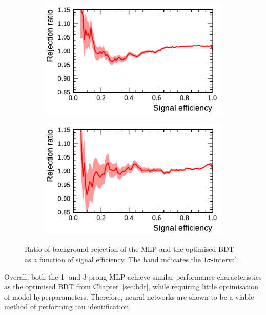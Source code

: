 \begin{figure}[htb]
  \begin{subfigure}[t]{0.48\textwidth}
    \centering
    \includegraphics{./figures/rnn/mlp/mlp_bdt_ratio_1p.pdf}
  \end{subfigure}\hfill
  \begin{subfigure}[t]{0.48\textwidth}
    \centering
    \includegraphics{./figures/rnn/mlp/mlp_bdt_ratio_3p.pdf}
  \end{subfigure}
  \caption[Ratio of the background rejection for MLP and optimised BDT as a
  function of signal efficiency]{Ratio of background rejection of the MLP and
    the optimised BDT as a function of signal efficiency. The band indicates the
    $1\sigma$-interval.}
  \label{fig:roc_mlp_bdt_comparison}
\end{figure}

Overall, both the 1- and 3-prong MLP achieve similar performance characteristics
as the optimised BDT from Chapter~\ref{sec:bdt}, while requiring little
optimisation of model hyperparameters. Therefore, neural networks are shown to
be a viable method of performing tau identification.

